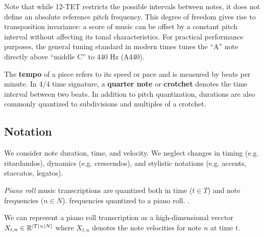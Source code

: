 Note that while 12-TET restricts the possible intervals between notes, it does
not define an absolute reference pitch frequency. This degree of freedom gives
rise to transposition invariance: a score of music can be offset by a constant
pitch interval without affecting its tonal characteristics. For practical
performance purposes, the general tuning standard in modern times tunes the ``A''
note directly above ``middle C'' to 440 Hz (A440).

The \textbf{tempo} of a piece refers to its speed or pace and is measured by beats
per minute. In 4/4 time signature, a \textbf{quarter note} or \textbf{crotchet} denotes
the time interval between two beats. In addition to pitch quantization,
durations are also commonly quantized to subdivisions and multiples of a
crotchet.

\subsection{Notation}

We consider note duration, time, and velocity. We neglect changes in timing
(e.g. ritardandos), dynamics (e.g. crescendos), and stylistic notations (e.g.
accents, staccatos, legatos).

\emph{Piano roll} music transcriptions are quantized both in time ($t \in T$)
and note frequencies ($n \in N$). frequencies quantized to a piano roll.
.

We can represent a piano roll transcription as a high-dimensional vecctor
$X_{t,n} \in \mathbb{R}^{|T| \times |N|}$ where $X_{t,n}$ denotes the note
velocities for note $n$ at time $t$.

